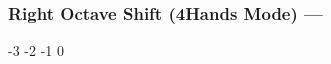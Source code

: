 \subsubsection[Right Octave Shift (4Hands)]{Right Octave Shift (4Hands Mode) --- \UiKey{\SET}}






































-3
-2
-1
0

